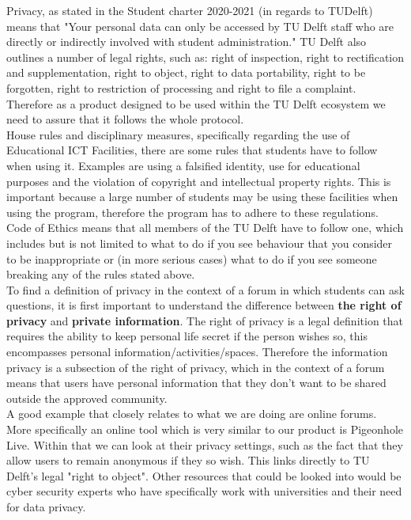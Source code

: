\documentclass{article}
\begin{document}
    Privacy, as stated in the Student charter 2020-2021 (in regards to TUDelft) means that "Your personal data can only be accessed by TU Delft staff who are directly or indirectly involved with student administration."\citep{TUDelftMan} TU Delft also outlines a number of legal rights, such as: right of inspection, right to rectification and supplementation, right to object, right to data portability, right to be forgotten, right to restriction of processing and right to file a complaint. Therefore as a product designed to be used within the TU Delft ecosystem we need to assure that it follows the whole protocol.\\

    House rules and disciplinary measures, specifically regarding the use of Educational ICT Facilities, there are some rules that students have to follow when using it. Examples are using a falsified identity, use for educational purposes and  the violation of copyright and intellectual property rights. This is important because a large number of students may be using these facilities when using the program, therefore the program has to adhere to these regulations.  \citep{TUDelftICT}\\

    Code of Ethics means that all members of the TU Delft have to follow one, which includes but is not limited to what to do if you see behaviour that you consider to be inappropriate or (in more serious cases) what to do if you see someone breaking any of the rules stated above. \citep{TUDelftMan}\\

    To find a definition of privacy in the context of a forum in which students can ask questions, it is first important to understand the difference between \textbf{the right of privacy} and \textbf{private information}. The right of privacy is a legal definition that requires the ability to keep personal life secret if the person wishes so, this encompasses  personal information/activities/spaces. Therefore the information privacy is a subsection of the right of privacy, which in the context of a forum means that users have personal information that they don't want to be shared outside the approved community. \citep{PrivacyComputing}\\

    A good example that closely relates to what we are doing are online forums. More specifically an online tool which is very similar to our product is Pigeonhole Live.\citep{pigeonlab}  Within that we can look at their privacy settings, such as the fact that they allow users to remain anonymous if they so wish. This links directly to TU Delft's legal "right to object"\citep{TUDelftMan}. Other resources that could be looked into would be cyber security experts who have specifically work with universities and their need for data privacy. \\
\end{document}
